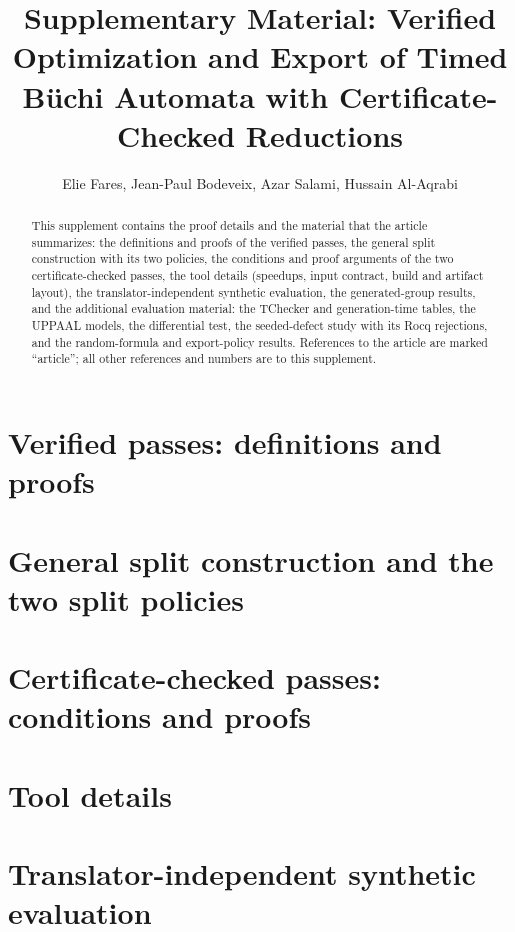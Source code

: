 \documentclass[preprint,12pt]{elsarticle}
\begin{document}
\begin{frontmatter}
\title{Supplementary Material: Verified Optimization and Export of Timed B\"uchi Automata with Certificate-Checked Reductions}
\author{Elie Fares, Jean-Paul Bodeveix, Azar Salami, Hussain Al-Aqrabi}
\begin{abstract}
This supplement contains the proof details and the material that the article summarizes: the definitions and proofs of the verified passes, the general split construction with its two policies, the conditions and proof arguments of the two certificate-checked passes, the tool details (speedups, input contract, build and artifact layout), the translator-independent synthetic evaluation, the generated-group results, and the additional evaluation material: the TChecker and generation-time tables, the UPPAAL models, the differential test, the seeded-defect study with its Rocq rejections, and the random-formula and export-policy results. References to the article are marked ``article''; all other references and numbers are to this supplement.
\end{abstract}
\end{frontmatter}

\section{Verified passes: definitions and proofs}\label{sec:passes}


\section{General split construction and the two split policies}


\section{Certificate-checked passes: conditions and proofs}\label{sec:checked-detail}


\section{Tool details}\label{sec:tool-details}


\section{Translator-independent synthetic evaluation}

\end{document}

